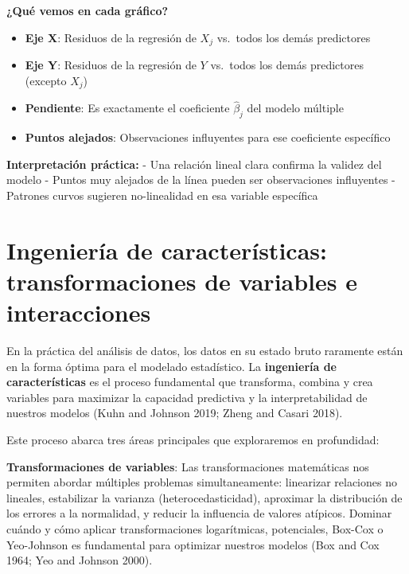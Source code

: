 \documentclass[
  letterpaper,
  DIV=11,
  numbers=noendperiod]{scrreprt}
\providecommand{\tightlist}{%
  \setlength{\itemsep}{0pt}\setlength{\parskip}{0pt}}
\begin{document}
\begin{tcolorbox}
\textbf{¿Qué vemos en cada gráfico?}

\begin{itemize}
\tightlist
\item
  \textbf{Eje X}: Residuos de la regresión de \(X_j\) vs.~todos los
  demás predictores
\item
  \textbf{Eje Y}: Residuos de la regresión de \(Y\) vs.~todos los demás
  predictores (excepto \(X_j\))
\item
  \textbf{Pendiente}: Es exactamente el coeficiente \(\hat{\beta}_j\)
  del modelo múltiple
\item
  \textbf{Puntos alejados}: Observaciones influyentes para ese
  coeficiente específico
\end{itemize}

\textbf{Interpretación práctica:} - Una relación lineal clara confirma
la validez del modelo - Puntos muy alejados de la línea pueden ser
observaciones influyentes - Patrones curvos sugieren no-linealidad en
esa variable específica

\end{tcolorbox}


\chapter{Ingeniería de características: transformaciones de variables e
interacciones}\label{sec-tema3}

En la práctica del análisis de datos, los datos en su estado bruto
raramente están en la forma óptima para el modelado estadístico. La
\textbf{ingeniería de características} es el proceso fundamental que
transforma, combina y crea variables para maximizar la capacidad
predictiva y la interpretabilidad de nuestros modelos (Kuhn and Johnson
2019; Zheng and Casari 2018).

Este proceso abarca tres áreas principales que exploraremos en
profundidad:

\textbf{Transformaciones de variables}: Las transformaciones matemáticas
nos permiten abordar múltiples problemas simultaneamente: linearizar
relaciones no lineales, estabilizar la varianza (heterocedasticidad),
aproximar la distribución de los errores a la normalidad, y reducir la
influencia de valores atípicos. Dominar cuándo y cómo aplicar
transformaciones logarítmicas, potenciales, Box-Cox o Yeo-Johnson es
fundamental para optimizar nuestros modelos (Box and Cox 1964; Yeo and
Johnson 2000).
\end{document}
